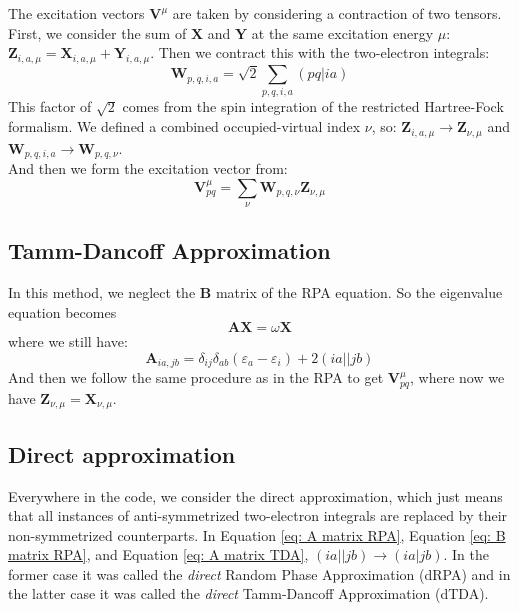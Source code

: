 \documentclass[12pt]{caltech_thesis}
\begin{document}
The excitation vectors $\textbf{V}^{\mu}$ are taken by considering a contraction of two tensors. First, we consider the sum of $\textbf{X}$ and $\textbf{Y}$ at the same excitation energy $\mu$: $\textbf{Z}_{i,a,\mu} = \textbf{X}_{i,a,\mu} + \textbf{Y}_{i,a,\mu}$. Then we contract this with the two-electron integrals:
\begin{equation}
    \textbf{W}_{p,q,i,a} = \sqrt{2} \sum_{p,q,i,a} (pq|ia)
\end{equation}
This factor of $\sqrt{2}$ comes from the spin integration of the restricted Hartree-Fock formalism.
We defined a combined occupied-virtual index $\nu$, so: $\textbf{Z}_{i,a,\mu} \rightarrow \textbf{Z}_{\nu, \mu}$ and $\textbf{W}_{p,q,i,a}\rightarrow \textbf{W}_{p,q,\nu}$.\\

And then we form the excitation vector from:
\begin{equation}
    \textbf{V}_{pq}^{\mu} = \sum_{\nu} \textbf{W}_{p,q,\nu}\textbf{Z}_{\nu, \mu}
\end{equation}

\subsection{Tamm-Dancoff Approximation}
In this method, we neglect the $\textbf{B}$ matrix of the RPA equation. So the eigenvalue equation becomes
\begin{equation}
    \textbf{A}\textbf{X} = \omega \textbf{X}
\end{equation}
where we still have:
\begin{equation}
    \textbf{A}_{ia,jb} = \delta _{ij}\delta _{ab}(\varepsilon _{a}- \varepsilon _{i}) + 2(ia||jb)
\label{eq: A matrix TDA}
\end{equation}
And then we follow the same procedure as in the RPA to get $\textbf{V}_{pq}^{\mu}$, where now we have $\textbf{Z}_{\nu, \mu} = \textbf{X}_{\nu, \mu}$.
\subsection{Direct approximation}
Everywhere in the code, we consider the direct approximation, which just means that all instances of anti-symmetrized two-electron integrals are replaced by their non-symmetrized counterparts. In Equation \ref{eq: A matrix RPA}, Equation \ref{eq: B matrix RPA}, and Equation \ref{eq: A matrix TDA}, $(ia||jb) \rightarrow (ia|jb)$. In the former case it was called the \emph{direct} Random Phase Approximation (dRPA) and in the latter case it was called the \emph{direct} Tamm-Dancoff Approximation (dTDA).
\end{document}
